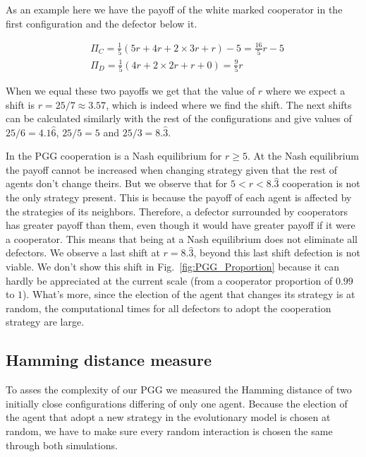 As an example here we have the payoff of the white marked cooperator in the first configuration and the defector below it.

\begin{equation}
    \begin{split}
    	&\Pi_C=\frac{1}{5}(5r+4r+2\times3r+r)-5=\frac{16}{5}r-5 \\
    	&\Pi_D=\frac{1}{5}(4r+2\times2r+r+0)=\frac{9}{5}r
    \end{split}
\end{equation}

When we equal these two payoffs we get that the value of $r$ where we expect a shift is $r=25/7\approx3.57$, which is indeed where we find the shift. The next shifts can be calculated similarly with the rest of the configurations and give values of $25/6=4.1\hat6$, $25/5=5$ and $25/3=8.\hat3$.


In the PGG cooperation is a Nash equilibrium for $r\geq5$. At the Nash equilibrium  the payoff cannot be increased when changing strategy given that the rest of agents don't change theirs. But we observe that for $5<r<8.\hat3$ cooperation is not the only strategy present. This is because the payoff of each agent is affected by the strategies of its neighbors. Therefore, a defector surrounded by cooperators has greater payoff than them, even though it would have greater payoff if it were a cooperator. This means that being at a Nash equilibrium does not eliminate all defectors. We observe a last shift at $r=8.\hat3$, beyond this last shift defection is not viable.  We don't show this shift in Fig.~\ref{fig:PGG_Proportion} because it can hardly be appreciated at the current scale (from a cooperator proportion of $0.99$ to $1$). What's more, since the election of the agent that changes its strategy is at random, the computational times for all defectors to adopt the cooperation strategy are large.





\subsection{Hamming distance measure}


To asses the complexity of our PGG we measured the Hamming distance of two initially close configurations differing of only one agent. Because the election of the agent that adopt a new strategy in the evolutionary model is chosen at random, we have to make sure every random interaction is chosen the same through both simulations.


